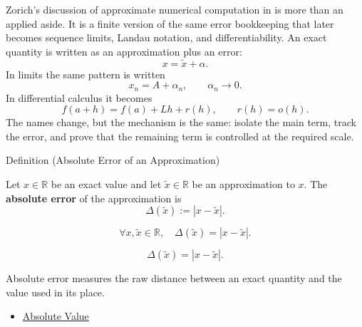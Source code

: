 \begin{exposition}
Zorich's discussion of approximate numerical computation in
\cite{ZorichMathematicalAnalysisI} is more than an applied aside. It is a
finite version of the same error bookkeeping that later becomes sequence
limits, Landau notation, and differentiability. An exact quantity is written
as an approximation plus an error:
\[
  x=\widetilde{x}+\alpha.
\]
In limits the same pattern is written
\[
  x_n=A+\alpha_n,\qquad \alpha_n\to 0.
\]
In differential calculus it becomes
\[
  f(a+h)=f(a)+Lh+r(h),\qquad r(h)=o(h).
\]
The names change, but the mechanism is the same: isolate the main term,
track the error, and prove that the remaining term is controlled at the
required scale.
\end{exposition}

\begin{definitionbox}{Definition (Absolute Error of an Approximation)}
\begin{definition}
\label{def:absolute-error-approximation}
Let $x\in\mathbb{R}$ be an exact value and let $\widetilde{x}\in\mathbb{R}$
be an approximation to $x$. The \textbf{absolute error} of the approximation
is
\[
  \Delta(\widetilde{x}) := |x-\widetilde{x}|.
\]
\end{definition}
\end{definitionbox}

\begin{remark*}
\[
\forall x,\widetilde{x}\in\mathbb{R},\quad
\Delta(\widetilde{x})=|x-\widetilde{x}|.
\]
\end{remark*}

\begin{remark*}
\[
\Delta(\widetilde{x})=|x-\widetilde{x}|.
\]
\end{remark*}

\begin{remark*}[Interpretation]
Absolute error measures the raw distance between an exact quantity and the value used in its place.
\end{remark*}

\begin{dependencies}
\begin{itemize}
  \item \hyperref[def:absolute-value]{Absolute Value}
\end{itemize}
\end{dependencies}

